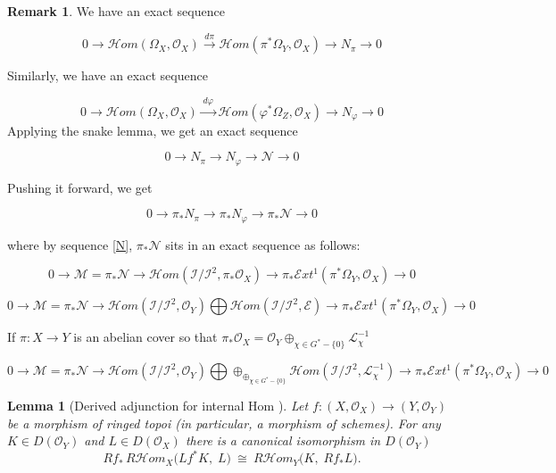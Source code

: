 \documentclass[11pt,twoside]{amsart}
\theoremstyle{plain}
\numberwithin{equation}{section}
\newtheorem{lemma}[theorem]{Lemma}
\theoremstyle{definition}
\newtheorem{remark}[theorem]{Remark}
\begin{document}
\begin{remark}
    We have an exact sequence

    $$0 \to \mathcal{H}om(\Omega_{X},\mathcal O_{X})
\xrightarrow{\,d\pi\,}
\mathcal{H}om(\pi^{*}\Omega_{Y},\mathcal O_{X}) \to N_{\pi} \to 0$$

Similarly, we have an exact sequence 

$$0 \to \mathcal{H}om(\Omega_{X},\mathcal O_{X})
\xrightarrow{\,d\varphi\,}
\mathcal{H}om(\varphi^{*}\Omega_{Z},\mathcal O_{X}) \to N_{\varphi} \to 0$$Applying the snake lemma, we get an exact sequence 

$$ 0 \to N_{\pi} \to N_{\varphi} \to \mathcal{N} \to 0$$

Pushing it forward, we get 

$$ 0 \to \pi_*N_{\pi} \to \pi_*N_{\varphi} \to \pi_*\mathcal{N} \to 0$$

where by sequence \ref{N}, $\pi_*\mathcal{N}$ sits in an exact sequence as follows:

$$0 \to \mathcal{M} = \pi_*\mathcal{N} \to \mathcal{H}om(\mathcal{I}/\mathcal{I}^2, \pi_*\mathcal{O}_X) \to \pi_*\mathcal{E}xt^1(\pi^*\Omega_Y, \mathcal{O}_X) \to 0$$

$$0 \to \mathcal{M} = \pi_*\mathcal{N} \to \mathcal{H}om(\mathcal{I}/\mathcal{I}^2, \mathcal{O}_Y) \bigoplus \mathcal{H}om(\mathcal{I}/\mathcal{I}^2, \mathcal{E}) \to \pi_*\mathcal{E}xt^1(\pi^*\Omega_Y, \mathcal{O}_X) \to 0$$


If $\pi: X \to Y$ is an abelian cover so that $\pi_*\mathcal{O}_X = \mathcal{O}_Y \oplus_{\chi \in G^*-\{0\} }\mathcal{L}_{\chi}^{-1}$

$$0 \to \mathcal{M} = \pi_*\mathcal{N} \to \mathcal{H}om(\mathcal{I}/\mathcal{I}^2, \mathcal{O}_Y) \bigoplus \oplus_{\oplus_{\chi \in G^*-\{0\} } }\mathcal{H}om(\mathcal{I}/\mathcal{I}^2, \mathcal{L}_{\chi}^{-1}) \to \pi_*\mathcal{E}xt^1(\pi^*\Omega_Y, \mathcal{O}_X) \to 0$$

\end{remark}


\begin{lemma}[Derived adjunction for internal Hom {\cite[Tags 07A6, 07A4, 08J9]{stacks-project}}]
\label{lem:derived-adjunction-internal-hom}
Let $f : (X,\mathcal O_X)\to (Y,\mathcal O_Y)$ be a morphism of ringed topoi (in particular, a morphism
of schemes). For any $K\in D(\mathcal O_Y)$ and $L\in D(\mathcal O_X)$ there is a canonical isomorphism
in $D(\mathcal O_Y)$
\[
Rf_*\,R\mathcal H\!om_X\bigl(Lf^*K,\;L\bigr)\ \cong\ R\mathcal H\!om_Y\bigl(K,\;Rf_*L\bigr).
\]
\end{lemma}
\end{document}
